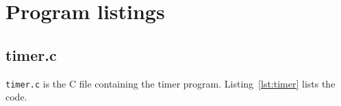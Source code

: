 \section{Program listings}
\subsection{timer.c}
\texttt{timer.c} is the C file containing the timer program. Listing~\ref{lst:timer} lists the code.
